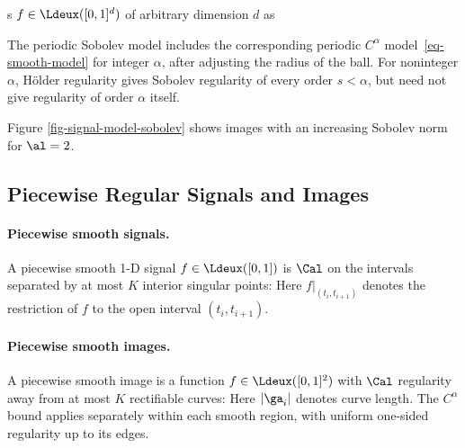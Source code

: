 s $f \in \Ldeux([0,1]^d)$ of arbitrary dimension $d$ as

The periodic Sobolev model
includes the corresponding periodic $C^\alpha$ model~\eqref{eq-smooth-model} for integer $\alpha$, after adjusting the radius of the ball. For noninteger $\alpha$, H\"older regularity gives Sobolev regularity of every order $s<\alpha$, but need not give regularity of order $\alpha$ itself.

Figure \ref{fig-signal-model-sobolev} shows images with an increasing Sobolev norm for $\al=2$.



                                           
\subsection{Piecewise Regular Signals and Images}

  
\paragraph{Piecewise smooth signals.}

A piecewise smooth 1-D signal $f \in \Ldeux([0,1])$ is $\Cal$ on the intervals separated by at most $K$ interior singular points:
Here $f|_{(t_i,t_{i+1})}$ denotes the restriction of $f$ to the open interval $(t_i,t_{i+1})$.

  
\paragraph{Piecewise smooth images.}

A piecewise smooth image is a function $f \in \Ldeux([0,1]^2)$ with $\Cal$ regularity away from at most $K$ rectifiable curves:
Here $|\ga_i|$ denotes curve length. The $C^\alpha$ bound applies separately within each smooth region, with uniform one-sided regularity up to its edges.

